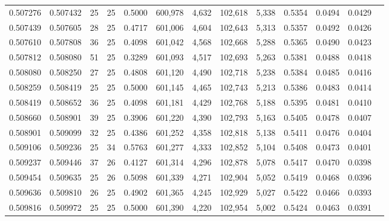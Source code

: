 \begin{tabular}{rrrrrrrrrrrrr}
0.507276 & 0.507432 &    25 &  25 &                                     0.5000 & 600,978 &   4,632 & 102,618 &   5,338 & 0.5354 & 0.0494 & 0.0429 \\
0.507439 & 0.507605 &    28 &  25 &                                     0.4717 & 601,006 &   4,604 & 102,643 &   5,313 & 0.5357 & 0.0492 & 0.0426 \\
0.507610 & 0.507808 &    36 &  25 &                                     0.4098 & 601,042 &   4,568 & 102,668 &   5,288 & 0.5365 & 0.0490 & 0.0423 \\
0.507812 & 0.508080 &    51 &  25 &                                     0.3289 & 601,093 &   4,517 & 102,693 &   5,263 & 0.5381 & 0.0488 & 0.0418 \\
0.508080 & 0.508250 &    27 &  25 &                                     0.4808 & 601,120 &   4,490 & 102,718 &   5,238 & 0.5384 & 0.0485 & 0.0416 \\
0.508259 & 0.508419 &    25 &  25 &                                     0.5000 & 601,145 &   4,465 & 102,743 &   5,213 & 0.5386 & 0.0483 & 0.0414 \\
0.508419 & 0.508652 &    36 &  25 &                                     0.4098 & 601,181 &   4,429 & 102,768 &   5,188 & 0.5395 & 0.0481 & 0.0410 \\
0.508660 & 0.508901 &    39 &  25 &                                     0.3906 & 601,220 &   4,390 & 102,793 &   5,163 & 0.5405 & 0.0478 & 0.0407 \\
0.508901 & 0.509099 &    32 &  25 &                                     0.4386 & 601,252 &   4,358 & 102,818 &   5,138 & 0.5411 & 0.0476 & 0.0404 \\
0.509106 & 0.509236 &    25 &  34 &                                     0.5763 & 601,277 &   4,333 & 102,852 &   5,104 & 0.5408 & 0.0473 & 0.0401 \\
0.509237 & 0.509446 &    37 &  26 &                                     0.4127 & 601,314 &   4,296 & 102,878 &   5,078 & 0.5417 & 0.0470 & 0.0398 \\
0.509454 & 0.509635 &    25 &  26 &                                     0.5098 & 601,339 &   4,271 & 102,904 &   5,052 & 0.5419 & 0.0468 & 0.0396 \\
0.509636 & 0.509810 &    26 &  25 &                                     0.4902 & 601,365 &   4,245 & 102,929 &   5,027 & 0.5422 & 0.0466 & 0.0393 \\
0.509816 & 0.509972 &    25 &  25 &                                     0.5000 & 601,390 &   4,220 & 102,954 &   5,002 & 0.5424 & 0.0463 & 0.0391 \\

\end{tabular}
